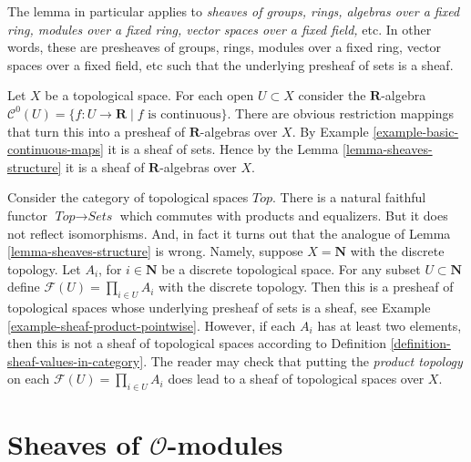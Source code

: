\noindent
The lemma in particular applies to
{\it sheaves of groups, rings, algebras over a fixed ring, modules
over a fixed ring, vector spaces over a fixed field,} etc.
In other words, these are presheaves of groups, rings,
modules over a fixed ring, vector spaces over a fixed field, etc
such that the underlying presheaf of sets is a sheaf.

\begin{example}
\label{example-C0-sheaf-rings}
Let $X$ be a topological space. For each open $U \subset X$ consider
the $\mathbf{R}$-algebra
$\mathcal{C}^{0}(U) = \{ f : U \to \mathbf{R} \mid f\text{ is continuous}\}$.
There are obvious restriction mappings that turn this into a
presheaf of $\mathbf{R}$-algebras over $X$.
By Example \ref{example-basic-continuous-maps} it is a sheaf of sets.
Hence by the Lemma \ref{lemma-sheaves-structure} it is a sheaf of
$\mathbf{R}$-algebras over $X$.
\end{example}

\begin{example}
\label{example-sheaves-topological-spaces}
Consider the category of topological spaces $\textit{Top}$.
There is a natural faithful functor $\textit{Top} \to \textit{Sets}$
which commutes with products and equalizers. But it does
not reflect isomorphisms. And, in fact it turns out that
the analogue of Lemma \ref{lemma-sheaves-structure} is wrong.
Namely, suppose $X = \mathbf{N}$ with the discrete
topology. Let $A_i$, for $i \in \mathbf{N}$ be a discrete
topological space. For any subset $U \subset \mathbf{N}$
define $\mathcal{F}(U) = \prod_{i\in U} A_i$ with the
discrete topology. Then this is a presheaf of topological
spaces whose underlying presheaf of sets is a sheaf, see
Example \ref{example-sheaf-product-pointwise}.
However, if each $A_i$ has at least two elements, then
this is not a sheaf of topological spaces
according to Definition \ref{definition-sheaf-values-in-category}.
The reader may check that putting the {\it product topology} on
each $\mathcal{F}(U) = \prod_{i\in U} A_i$ does lead to a sheaf
of topological spaces over $X$.
\end{example}


\section{Sheaves of $\mathcal{O}$-modules}
\label{section-sheaves-modules}

